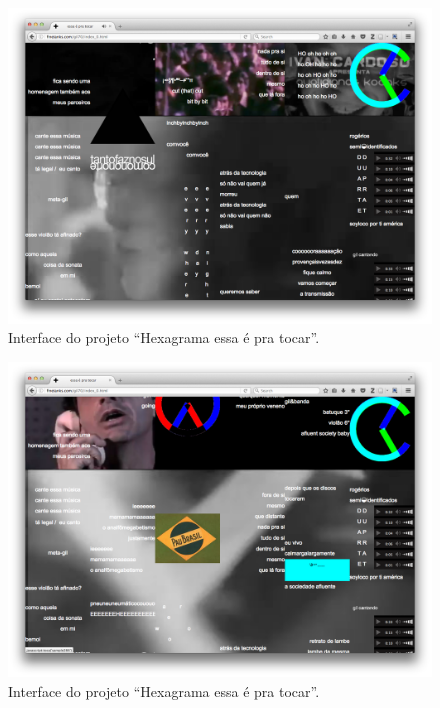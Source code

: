 \begin{figure}

\includegraphics[width=1\textwidth]{pictures/cap1/gil701}
\caption{Interface do projeto ``Hexagrama essa é pra tocar''.}
\label{fig:gil701}
\end{figure}

\begin{figure}

\includegraphics[width=1\textwidth]{pictures/cap1/gil702}
\caption{Interface do projeto ``Hexagrama essa é pra tocar''.}
\label{fig:gil702}
\end{figure}

